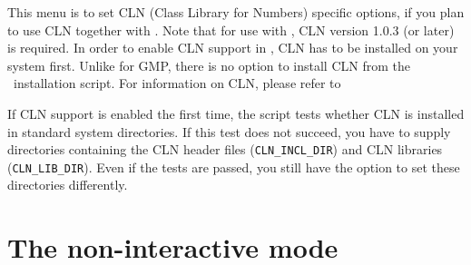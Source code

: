 This menu is to set CLN (Class Library for Numbers) specific options,
if you plan to use CLN together with \cgal . Note that for use with
\cgal, CLN version 1.0.3 (or later) is required. In order to enable
CLN support in \cgal, CLN has to be installed on your system first.
Unlike for GMP, there is no option to install CLN from the \cgal\ 
installation script.  For information on CLN, please refer to
\begin{quote}
  \clnpage
\end{quote}

If CLN support is enabled the first time, the script tests whether CLN
is installed in standard system directories. If this test does not
succeed, you have to supply directories containing the CLN header
files (\texttt{CLN\_INCL\_DIR})\TTindex{CLN\_INCL\_DIR} and CLN
libraries ({\tt CLN\_LIB\_DIR}). Even if the
tests are passed, you still have the option to set these directories
differently.\bigskip


\section{The non-interactive mode}\label{sec:non-interactive}

